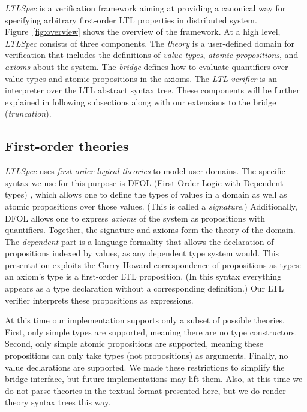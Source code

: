 \documentclass[format=acmsmall, nonacm=true, review=true, screen=true]{acmart}
\newcommand{\ltlspec}{\textit{LTLSpec}\xspace}
\begin{document}
\ltlspec is a verification framework aiming at providing a canonical way for specifying arbitrary first-order LTL properties in distributed system.
Figure~\ref{fig:overview} shows the overview of the framework.
At a high level, \ltlspec consists of three components.
The \textit{theory} is a user-defined domain for verification that includes the definitions of \textit{value types}, \textit{atomic propositions}, and \textit{axioms} about the system.
The \textit{bridge} defines how to evaluate quantifiers over value types and atomic propositions in the axioms.
The \textit{LTL verifier} is an interpreter over the LTL abstract syntax tree.
These components will be further explained in following subsections along with our extensions to the bridge (\textit{truncation}).

\subsection{First-order theories}
\label{subsec:theory}

\ltlspec uses \textit{first-order logical theories} to model user domains.
The specific syntax we use for this purpose is DFOL (First Order Logic with Dependent types) \cite{hutchison_first-order_2006}, which allows one to define the types of values in a domain as well as atomic propositions over those values. (This is called a \textit{signature}.)
Additionally, DFOL allows one to express \textit{axioms} of the system as propositions with quantifiers. Together, the signature and axioms form the theory of the domain. The \textit{dependent} part is a language formality that allows the declaration of propositions indexed by values, as any dependent type system would. This presentation exploits the Curry-Howard correspondence of propositions as types: an axiom's type is a first-order LTL proposition. (In this syntax everything appears as a type declaration without a corresponding definition.) Our LTL verifier interprets these propositions as expressions.

At this time our implementation supports only a subset of possible theories. First, only simple types are supported, meaning there are no type constructors. Second, only simple atomic propositions are supported, meaning these propositions can only take types (not propositions) as arguments. Finally, no value declarations are supported. We made these restrictions to simplify the bridge interface, but future implementations may lift them. Also, at this time we do not parse theories in the textual format presented here, but we do render theory syntax trees this way.
\end{document}
